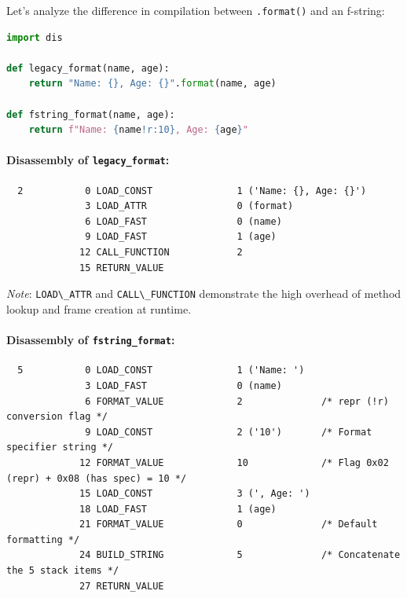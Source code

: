 Let's analyze the difference in compilation between
\passthrough{\lstinline!.format()!} and an f-string:

\begin{lstlisting}[language=Python]
import dis

def legacy_format(name, age):
    return "Name: {}, Age: {}".format(name, age)

def fstring_format(name, age):
    return f"Name: {name!r:10}, Age: {age}"
\end{lstlisting}

\hypertarget{disassembly-of-legacy_format}{%
\paragraph{\texorpdfstring{Disassembly of
\texttt{legacy\_format}:}{Disassembly of legacy\_format:}}\label{disassembly-of-legacy_format}}

\begin{lstlisting}
  2           0 LOAD_CONST               1 ('Name: {}, Age: {}')
              3 LOAD_ATTR                0 (format)
              6 LOAD_FAST                0 (name)
              9 LOAD_FAST                1 (age)
             12 CALL_FUNCTION            2
             15 RETURN_VALUE
\end{lstlisting}

\emph{Note}: \passthrough{\lstinline!LOAD\_ATTR!} and
\passthrough{\lstinline!CALL\_FUNCTION!} demonstrate the high overhead
of method lookup and frame creation at runtime.

\hypertarget{disassembly-of-fstring_format}{%
\paragraph{\texorpdfstring{Disassembly of
\texttt{fstring\_format}:}{Disassembly of fstring\_format:}}\label{disassembly-of-fstring_format}}

\begin{lstlisting}
  5           0 LOAD_CONST               1 ('Name: ')
              3 LOAD_FAST                0 (name)
              6 FORMAT_VALUE             2              /* repr (!r) conversion flag */
              9 LOAD_CONST               2 ('10')       /* Format specifier string */
             12 FORMAT_VALUE             10             /* Flag 0x02 (repr) + 0x08 (has spec) = 10 */
             15 LOAD_CONST               3 (', Age: ')
             18 LOAD_FAST                1 (age)
             21 FORMAT_VALUE             0              /* Default formatting */
             24 BUILD_STRING             5              /* Concatenate the 5 stack items */
             27 RETURN_VALUE
\end{lstlisting}

